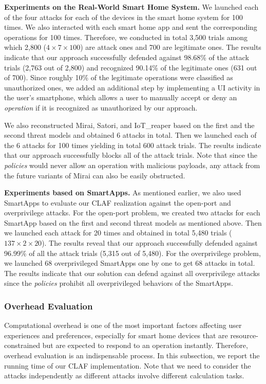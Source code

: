 \documentclass[letterpaper,12pt]{article}
\begin{document}
\textbf{Experiments on the Real-World Smart Home System.} 
We launched each of the four attacks for each of the devices in the smart home system for 100 times. We also interacted with each smart home app and sent the corresponding operations for 100 times. Therefore, we conducted in total 3,500 trials among which 2,800 ($4\times 7\times 100$) are attack ones and 700 are legitimate ones. The results indicate that our approach successfully defended against 98.68\% of the attack trials (2,763 out of 2,800) and recognized 90.14\% of the legitimate ones (631 out of 700). Since roughly 10\% of the legitimate operations were classified as unauthorized ones, we added an additional step by implementing a UI activity in the user's smartphone, which allows a user to manually accept or deny an \textit{operation} if it is recognized as unauthorized by our approach.

We also reconstructed Mirai, Satori, and IoT\_reaper based on the first and the second threat models and obtained 6 attacks in total. Then we launched each of the 6 attacks for 100 times yielding in total 600 attack trials. The results indicate that our approach successfully blocks all of the attack trials. Note that since the \textit{policies} would never allow an operation with malicious payloads, any attack from the future variants of Mirai can also be easily obstructed.

\textbf{Experiments based on SmartApps.} 
As mentioned earlier, we also used SmartApps to evaluate our CLAF realization against the open-port and overprivilege attacks. For the open-port problem, we created two attacks for each SmartApp based on the first and second threat models as mentioned above. Then we launched each attack for 20 times and obtained in total 5,480 trials ($137\times 2 \times 20$). The results reveal that our approach successfully defended against 96.99\% of all the attack trials (5,315 out of 5,480). For the overprivilege problem, we launched 68 overprivileged SmartApps one by one to get 68 attacks in total. The results indicate that our solution can defend against all overprivilege attacks since the \textit{policies} prohibit all overprivileged behaviors of the SmartApps. 

\subsubsection{Overhead Evaluation}
Computational overhead is one of the most important factors affecting user experiences and preferences, especially for smart home devices that are resource-constrained but are expected to respond to an operation instantly. Therefore, overhead evaluation is an indispensable process. In this subsection, we report the running time of our CLAF implementation. Note that we need to consider the attacks independently as different attacks involve different calculation tasks.
\end{document}
